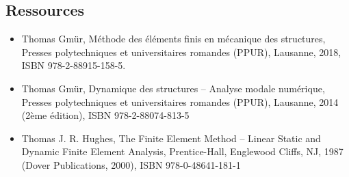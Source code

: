 \documentclass[11pt]{amsart}
\begin{document}
\subsection*{Ressources}
\begin{itemize}
\item Thomas Gmür, Méthode des éléments finis en mécanique des structures, Presses polytechniques et universitaires romandes (PPUR), Lausanne, 2018, ISBN 978-2-88915-158-5. 
\item Thomas Gmür, Dynamique des structures – Analyse modale numérique, Presses polytechniques et universitaires romandes (PPUR), Lausanne, 2014 (2ème édition), ISBN 978-2-88074-813-5
\item Thomas J. R. Hughes, The Finite Element Method – Linear Static and Dynamic Finite Element Analysis, Prentice-Hall, Englewood Cliffs, NJ, 1987 (Dover Publications, 2000), ISBN 978-0-48641-181-1
\end{itemize}
\end{document}
